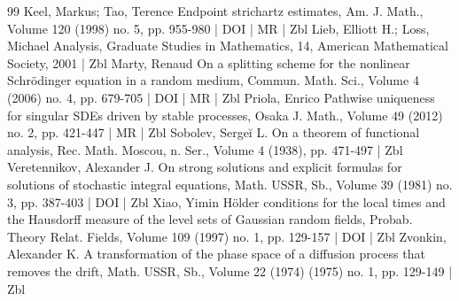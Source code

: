 \documentclass[10pt]{amsart}
\theoremstyle{definition}\newtheorem{defi}[theo]{Definition}\newtheorem{rema}[theo]{Remark}\newtheorem{exam}[theo]{Example}\newtheorem{exem}[theo]{Example}\newtheorem{nota}[theo]{Notation}
\begin{document}
\begin{thebibliography}{99}
Keel, Markus; Tao, Terence Endpoint strichartz estimates, Am. J. Math., Volume 120 (1998) no. 5, pp. 955-980 | DOI | MR | Zbl
Lieb, Elliott H.; Loss, Michael Analysis, Graduate Studies in Mathematics, 14, American Mathematical Society, 2001 | Zbl
Marty, Renaud On a splitting scheme for the nonlinear Schrödinger equation in a random medium, Commun. Math. Sci., Volume 4 (2006) no. 4, pp. 679-705 | DOI | MR | Zbl
Priola, Enrico Pathwise uniqueness for singular SDEs driven by stable processes, Osaka J. Math., Volume 49 (2012) no. 2, pp. 421-447 | MR | Zbl
Sobolev, Sergeĭ L. On a theorem of functional analysis, Rec. Math. Moscou, n. Ser., Volume 4 (1938), pp. 471-497 | Zbl
Veretennikov, Alexander J. On strong solutions and explicit formulas for solutions of stochastic integral equations, Math. USSR, Sb., Volume 39 (1981) no. 3, pp. 387-403 | DOI | Zbl
Xiao, Yimin Hölder conditions for the local times and the Hausdorff measure of the level sets of Gaussian random fields, Probab. Theory Relat. Fields, Volume 109 (1997) no. 1, pp. 129-157 | DOI | Zbl
Zvonkin, Alexander K. A transformation of the phase space of a diffusion process that removes the drift, Math. USSR, Sb., Volume 22 (1974) (1975) no. 1, pp. 129-149 | Zbl
\end{thebibliography}
\end{document}
